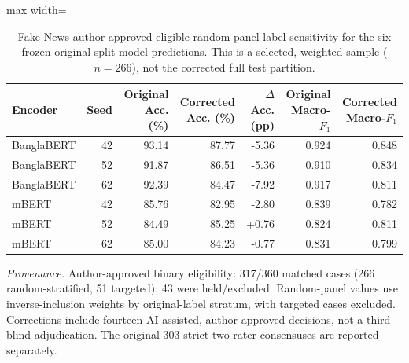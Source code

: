 \begin{table}[p]
\centering
\caption{Fake News author-approved eligible random-panel label sensitivity
for the six frozen original-split model predictions. This is a selected,
weighted sample ($n=266$), not the corrected full test partition.}
\label{tab:fn266}
\footnotesize
\begin{adjustbox}{max width=\linewidth}
\begin{tabular}{lrrrrrr}
\toprule
Encoder & Seed & Original Acc. (\%) & Corrected Acc. (\%) &
$\Delta$ Acc. (pp) & Original Macro-$F_1$ & Corrected Macro-$F_1$ \\
\midrule
BanglaBERT & 42 & 93.14 & 87.77 & -5.36 & 0.924 & 0.848 \\
BanglaBERT & 52 & 91.87 & 86.51 & -5.36 & 0.910 & 0.834 \\
BanglaBERT & 62 & 92.39 & 84.47 & -7.92 & 0.917 & 0.811 \\
mBERT & 42 & 85.76 & 82.95 & -2.80 & 0.839 & 0.782 \\
mBERT & 52 & 84.49 & 85.25 & +0.76 & 0.824 & 0.811 \\
mBERT & 62 & 85.00 & 84.23 & -0.77 & 0.831 & 0.799 \\
\bottomrule
\end{tabular}
\end{adjustbox}
\par\smallskip
\begin{minipage}{\linewidth}\scriptsize
\emph{Provenance.} Author-approved binary eligibility: 317/360 matched
cases (266 random-stratified, 51 targeted); 43 were held/excluded.
Random-panel values use inverse-inclusion weights by original-label
stratum, with targeted cases excluded. Corrections include fourteen
AI-assisted, author-approved decisions, not a third blind adjudication.
The original 303 strict two-rater consensuses are reported separately.
\end{minipage}
\end{table}

